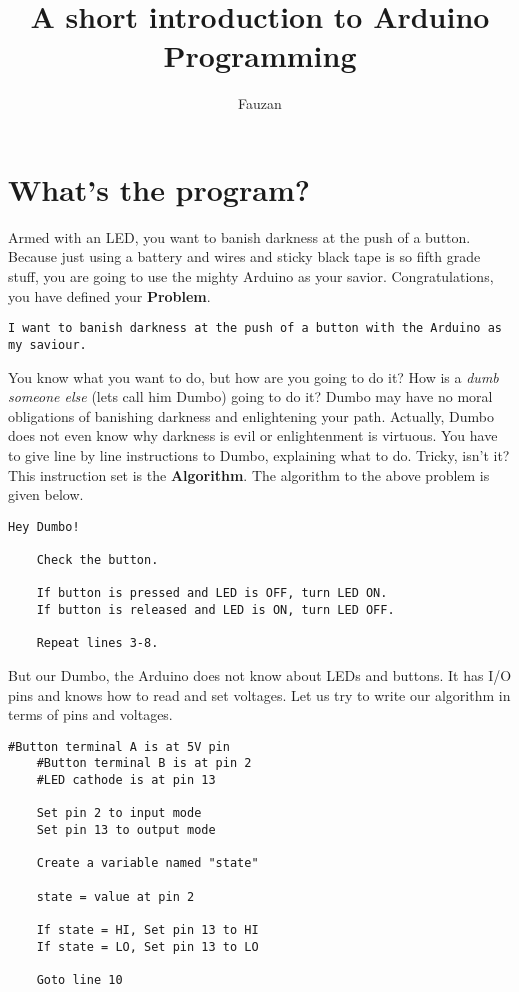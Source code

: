 \documentclass{article}
\begin{document}
\newcommand{\inlncd}[1]{\colorbox{lgray}{\texttt{#1}}}

\title{A short introduction to Arduino Programming}
\author{Fauzan}
\maketitle

\section{What's the program?}
	Armed with an LED, you want to banish darkness at the push of a button\@. Because just using a battery and wires and sticky black tape is so fifth grade stuff, you are going to use the mighty Arduino as your savior. Congratulations, you have defined your \textbf{Problem}.

	\begin{lstlisting}[gobble=4]
	I want to banish darkness at the push of a button with the Arduino as my saviour.
	\end{lstlisting}

	You know what you want to do, but how are you going to do it? How is a \textit{dumb someone else} (lets call him Dumbo) going to do it? Dumbo may have no moral obligations of banishing darkness and enlightening your path. Actually, Dumbo does not even know why darkness is evil or enlightenment is virtuous. You have to give line by line instructions to Dumbo, explaining what to do. Tricky, isn't it? This instruction set is the \textbf{Algorithm}. The algorithm to the above problem is given below.

	\begin{lstlisting}[gobble=4]
	Hey Dumbo!

	Check the button.

	If button is pressed and LED is OFF, turn LED ON.
	If button is released and LED is ON, turn LED OFF.

	Repeat lines 3-8.
	\end{lstlisting}

	But our Dumbo, the Arduino does not know about LEDs and buttons. It has I/O pins and knows how to read and set voltages. Let us try to write our algorithm in terms of pins and voltages.

	\begin{lstlisting}[gobble=4]
	#Button terminal A is at 5V pin
	#Button terminal B is at pin 2
	#LED cathode is at pin 13

	Set pin 2 to input mode
	Set pin 13 to output mode

	Create a variable named "state"

	state = value at pin 2

	If state = HI, Set pin 13 to HI
	If state = LO, Set pin 13 to LO

	Goto line 10
	\end{lstlisting}
\end{document}
